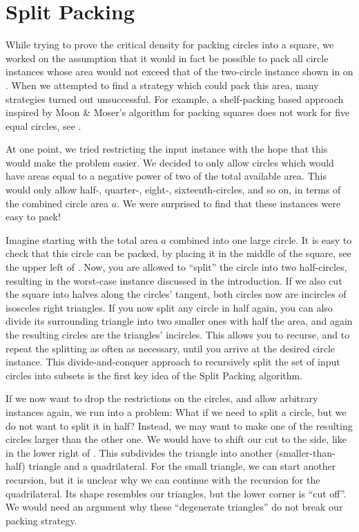 \documentclass[a4paper,style=print,bibliography=totoc,nexus,lnum,extramargin]{tubsbook}
\begin{document}
\chapter{Split Packing}\label{ch:split-packing}

While trying to prove the critical density for packing circles into a square, we worked on the assumption that it would in fact be possible to pack all circle instances whose area would not exceed that of the two-circle instance shown in  on .
When we attempted to find a strategy which could pack this area, many strategies turned out unsuccessful. For example, a shelf-packing based approach inspired by Moon \& Moser's algorithm for packing squares does not work for five equal circles, see .


At one point, we tried restricting the input instance with the hope that this would make the problem easier. We decided to only allow circles which would have areas equal to a negative power of two of the total available area. This would only allow half-, quarter-, eight-, sixteenth-circles, and so on, in terms of the combined circle area $a$. We were surprised to find that these instances were easy to pack!

Imagine starting with the total area $a$ combined into one large circle. It is easy to check that this circle can be packed, by placing it in the middle of the square, see the upper left of . Now, you are allowed to “split” the circle into two half-circles, resulting in the worst-case instance discussed in the introduction. If we also cut the square into halves along the circles' tangent, both circles now are incircles of isosceles right triangles.
If you now split any circle in half again, you can also divide its surrounding triangle into two smaller ones with half the area, and again the resulting circles are the triangles' incircles.
This allows you to recurse, and to repeat the splitting as often as necessary, until you arrive at the desired circle instance. This divide-and-conquer approach to recursively split the set of input circles into subsets is the first key idea of the Split Packing algorithm.


If we now want to drop the restrictions on the circles, and allow arbitrary instances again, we run into a problem: What if we need to split a circle, but we do not want to split it in half? Instead, we may want to make one of the resulting circles larger than the other one. We would have to shift our cut to the side, like in the lower right of . This subdivides the triangle into another (smaller-than-half) triangle and a quadrilateral. For the small triangle, we can start another recursion, but it is unclear why we can continue with the recursion for the quadrilateral. Its shape resembles our triangles, but the lower corner is “cut off”. We would need an argument why these “degenerate triangles” do not break our packing strategy.
\end{document}
